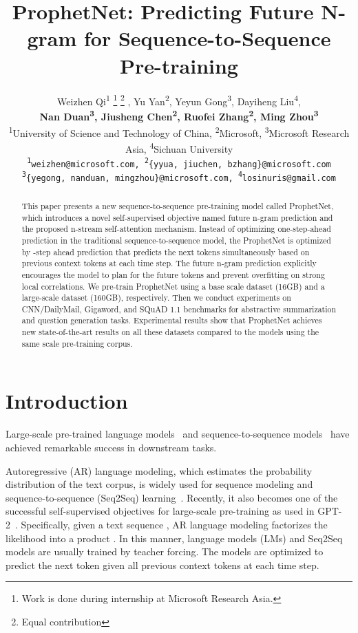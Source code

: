 \documentclass[11pt,a4paper]{article}
\title{ProphetNet: Predicting Future N-gram for Sequence-to-Sequence Pre-training}
\author{Weizhen Qi\textsuperscript{1} \thanks{ \hspace{1mm}Work is done during internship at Microsoft Research Asia.}     \thanks{ \hspace{1mm} Equal contribution} , Yu Yan\textsuperscript{2}\footnotemark[2], Yeyun Gong\textsuperscript{3}\footnotemark[2], Dayiheng Liu\textsuperscript{4}\footnotemark[2], \\
\textbf{Nan Duan\textsuperscript{3}, Jiusheng Chen\textsuperscript{2},  Ruofei Zhang\textsuperscript{2}, Ming Zhou\textsuperscript{3}}  \\
  \textsuperscript{1}University of Science and Technology of China, \textsuperscript{2}Microsoft, \textsuperscript{3}Microsoft Research Asia,
  \textsuperscript{4}Sichuan University  \\
  \texttt{\textsuperscript{1}weizhen@microsoft.com, \textsuperscript{2}\{yyua, jiuchen, bzhang\}@microsoft.com} \\  
  \texttt{\textsuperscript{3}\{yegong, nanduan, mingzhou\}@microsoft.com, \textsuperscript{4}losinuris@gmail.com}
  
  }
\date{}
\begin{document}
\maketitle
\begin{abstract}
This paper presents a new sequence-to-sequence pre-training model called ProphetNet, which introduces a novel self-supervised objective named future n-gram prediction and the proposed n-stream self-attention mechanism. Instead of optimizing one-step-ahead prediction in the traditional sequence-to-sequence model, the ProphetNet is optimized by -step ahead prediction that predicts the next  tokens simultaneously based on previous context tokens at each time step. The future n-gram prediction explicitly encourages the model to plan for the future tokens and prevent overfitting on strong local correlations.  We pre-train ProphetNet using a base scale dataset (16GB) and a large-scale dataset (160GB), respectively. Then we conduct experiments on CNN/DailyMail, Gigaword, and SQuAD 1.1 benchmarks for abstractive summarization and question generation tasks. Experimental results show that ProphetNet achieves new state-of-the-art results on all these datasets compared to the models using the same scale pre-training corpus.
\end{abstract}

\section{Introduction}
Large-scale pre-trained language models~\cite{devlin2018bert,radford2019language,yang2019xlnet} and sequence-to-sequence models~\cite{lewis2019bart, song2019mass, raffel2019exploring} have achieved remarkable success in downstream tasks. 

Autoregressive (AR) language modeling, which estimates the probability distribution of the text corpus, is widely used for sequence modeling and sequence-to-sequence (Seq2Seq) learning~\cite{sutskever2014sequence}. 
Recently, it also becomes one of the successful self-supervised objectives for large-scale pre-training as used in GPT-2~\cite{radford2019language}.
Specifically, given a text sequence , AR language modeling factorizes the likelihood into a product .
In this manner, language models (LMs) and Seq2Seq models are usually trained by teacher forcing. The models are optimized to predict the next token given all previous context tokens at each time step. 
\end{document}
